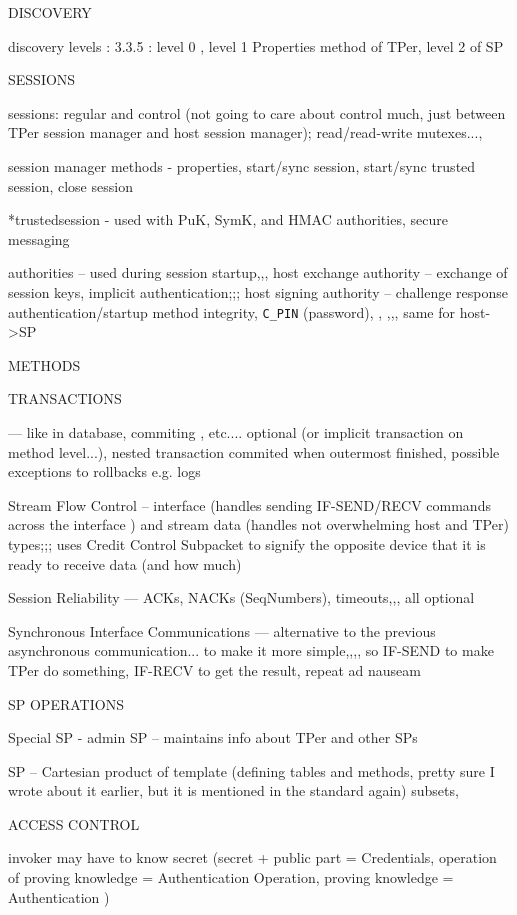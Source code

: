 \documentclass[
  digital, %
  oneside, %
  nolof,     %
  nolot,     %
]{fithesis4}
\begin{document}
DISCOVERY

discovery levels : 3.3.5 : level 0 , level 1 Properties method of TPer, level 2 of SP

SESSIONS

sessions: regular and control (not going to care about control much, just between TPer session manager and host session manager); read/read-write mutexes..., 

session manager methods - properties, start/sync session, start/sync trusted session, close session

*trustedsession - used with PuK, SymK, and HMAC authorities, secure messaging

authorities -- used during session startup,,, host exchange authority -- exchange of session keys, implicit authentication;;; host signing authority -- challenge response authentication/startup method integrity, \verb|C_PIN| (password), , ,,, same for host->SP

METHODS

TRANSACTIONS 


--- like in database, commiting , etc.... optional (or implicit transaction on method level...), nested transaction commited when outermost finished, possible exceptions to rollbacks e.g. logs

Stream Flow Control -- interface (handles  sending IF-SEND/RECV commands across the interface ) and stream data (handles not overwhelming host and TPer) types;;; uses Credit Control Subpacket to signify the opposite device that it is ready to receive data (and how much)

Session Reliability --- ACKs, NACKs (SeqNumbers), timeouts,,, all optional

Synchronous Interface Communications --- alternative to the previous asynchronous communication... to make it more simple,,,, so IF-SEND to make TPer do something, IF-RECV to get the result, repeat ad nauseam


SP OPERATIONS

Special SP - admin SP -- maintains info about TPer and other SPs

SP -- Cartesian product of template (defining tables and methods, pretty sure I wrote about it earlier, but it is mentioned in the standard again) subsets, 

ACCESS CONTROL

invoker may have to know secret (secret + public part = Credentials, operation of proving knowledge = Authentication Operation, proving knowledge = Authentication )
\end{document}
